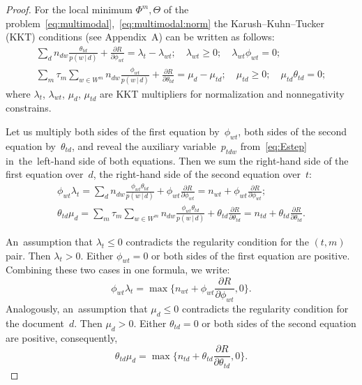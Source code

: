\documentclass{llncs}
\newcommand{\cond}{\mspace{3mu}{|}\mspace{3mu}}
\begin{document}
\begin{proof}
    For the local minimum $\Phi^m,\Theta$
    of the problem~\eqref{eq:multimodal},~\eqref{eq:multimodal:norm}
    the Karush--Kuhn--Tucker (KKT) conditions (see Appendix~A) can be written as follows:
    \begin{gather*}
        \sum_{d} n_{dw} \frac{\theta_{td}}{p(w\cond d)} + \frac{\partial R}{\partial \phi_{wt}}
        = \lambda_t - \lambda_{wt};
        \quad
        \lambda_{wt}\geq 0;
        \quad
        \lambda_{wt}\phi_{wt} = 0;
    \\
        \sum_{m} \tau_m \!\!\sum_{w\in W^m}\!\! n_{dw} \frac{\phi_{wt}}{p(w\cond d)} + \frac{\partial R}{\partial \theta_{td}}
        = \mu_d - \mu_{td};
        \quad
        \mu_{td}\geq 0;
        \quad
        \mu_{td}\theta_{td} = 0;
    \end{gather*}
    where $\lambda_t$, $\lambda_{wt}$, $\mu_d$, $\mu_{td}$
    are KKT multipliers for normalization and nonnegativity constrains.

    Let us multiply
    both sides of the first equation by~$\phi_{wt}$,
    both sides of the second equation by~$\theta_{td}$,
    and reveal the auxiliary variable~$p_{tdw}$ from~\eqref{eq:Estep}
    in~the~left-hand side of both equations.
    Then we sum
    the right-hand side of the first equation over~$d$,
    the right-hand side of the second equation over~$t$:
    \begin{gather*}
        \phi_{wt} \lambda_t
        =
        \sum_{d}
        n_{dw} \frac{\phi_{wt}\theta_{td}}{p(w\cond d)}
        + \phi_{wt} \frac{\partial R}{\partial \phi_{wt}}
        =
        n_{wt} + \phi_{wt} \frac{\partial R}{\partial \phi_{wt}};
    \\
        \theta_{td} \mu_{d}
        =
        \sum_{m} \tau_m \!\!\sum_{w\in W^m}\!\!
        n_{dw} \frac{\phi_{wt}\theta_{td}}{p(w\cond d)}
        + \theta_{td} \frac{\partial R}{\partial \theta_{td}}
        =
        n_{td} + \theta_{td} \frac{\partial R}{\partial \theta_{td}}.
    \end{gather*}

    An~assumption that $\lambda_t\leq 0$ contradicts the regularity condition for the $(t,m)$ pair.
    Then ${\lambda_t>0}$.
    Either ${\phi_{wt}= 0}$ or both sides of the first equation are positive.
    Combining these two cases in one formula, we write:
    \begin{equation}
    \label{eq:in-theorem-1:phi}
        \phi_{wt} \lambda_t
        =
        \max\biggl\{
        n_{wt} + \phi_{wt} \frac{\partial R}{\partial \phi_{wt}}, 0
        \biggr\}.
    \end{equation}
    Analogously,
    an~assumption that $\mu_d\leq 0$ contradicts the regularity condition for the document~$d$.
    Then ${\mu_d>0}$.
    Either ${\theta_{td}= 0}$ or both sides of the second equation are positive,
    consequently,
    \begin{equation}
    \label{eq:in-theorem-1:theta}
        \theta_{td} \mu_d
        =
        \max\biggl\{
        n_{td} + \theta_{td} \frac{\partial R}{\partial \theta_{td}}, 0
        \biggr\}.
    \end{equation}


\end{proof}
\end{document}
